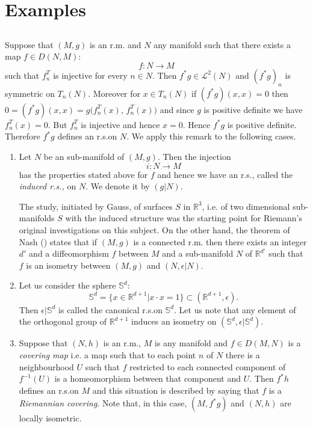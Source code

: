 \setcounter{section}{1}
\section{Examples}\label{chap3:sec2}

\subsection{}\label{chap3:3.2.1}
Suppose that $(M,g)$ is an r.m. and $N$ any manifold such that there
exists a map $f\in D(N,M)$:
$$
f:N\to M
$$
such that $f^{T}_{n}$ is injective for every $n\in N$. Then
$f^{\ast}g\in \mathscr{L}^{2}(N)$ and $(f^{\ast}g)_{n}$ is symmetric
on $T_{n}(N)$. Moreover for $x\in T_{n}(N)$ if $(f^{\ast}g)(x,x)=0$
then $0=(f^{\ast}g)(x,x)=g(f^{T}_{n}(x)$, $f^{T}_{n}(x))$ and since
$g$ is positive definite we have $f^{T}_{n}(x)=0$. But $f^{T}_{n}$ is
injective and hence $x=0$. Hence $f^{\ast}g$ is positive
definite. Therefore $f^{\ast}g$ defines an r.s.\@ on $N$. We apply this
remark to the following cases.
\begin{enumerate}
\renewcommand{\theenumi}{\Alph{enumi}}
\renewcommand{\labelenumi}{\theenumi)}
\item Let $N$ be an sub-manifold of $(M,g)$. Then the injection
$$
i:N\to M
$$
has the properties stated above for $f$ and hence we have an r.s.,
called the {\em induced r.s.,} on $N$. We denote it by $(g|N)$.

\quad 
The study, initiated by Gauss, of surfaces $S$ in $\mathbb{R}^{3}$,
i.e. of two dimensional sub-manifolds $S$ with the induced structure
was the starting point for Riemann's original investigations on this
subject. On the other hand, the theorem of Nash (\cite{34}) states
that if $(M,g)$ is a connected r.m. then there exists an integer $d'$
and a diffeomorphism $f$ between $M$ and a sub-manifold $N$ of
$\mathbb{R}^{d'}$ such that $f$ is an isometry between $(M,g)$ and
$(N,\epsilon|N)$.

\item Let \pageoriginale us consider the sphere $\mathbb{S}^{d}$:
$$
\mathbb{S}^{d}=\{x\in\mathbb{R}^{d+1}|x\cdot x=1\}\subset
(\mathbb{R}^{d+1},\epsilon).
$$
Then $\epsilon|\mathbb{S}^{d}$ is called the canonical r.s.\@ on
$\mathbb{S}^{d}$. Let us note that any element of the orthogonal group
of $\mathbb{R}^{d+1}$ induces an isometry on
$(\mathbb{S}^{d},\epsilon|\mathbb{S}^{d})$.

\item Suppose that $(N,h)$ is an r.m., $M$ is any manifold and $f\in
  D(M,N)$ is a {\em covering map} i.e. a map such that to each point
  $n$ of $N$ there is a neighbourhood $U$ such that $f$ restricted to
  each connected component of $f^{-1}(U)$ is a homeomorphism between
  that component and $U$. Then $f^{\ast}h$ defines an r.s.\@ on $M$ and
  this situation is described by saying that $f$ is a {\em Riemannian
    covering}. Note that, in this case, $(M,f^{\ast}g)$ and $(N,h)$
  are locally isometric. 
\end{enumerate}

